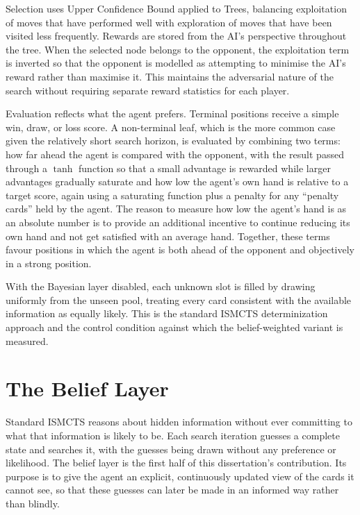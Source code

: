 \documentclass[12pt,a4paper,oneside]{report}
\begin{document}
Selection uses Upper Confidence Bound applied to Trees, balancing exploitation of moves that have performed well with exploration of moves that have been visited less frequently. Rewards are stored from the AI's perspective throughout the tree. When the selected node belongs to the opponent, the exploitation term is inverted so that the opponent is modelled as attempting to minimise the AI's reward rather than maximise it. This maintains the adversarial nature of the search without requiring separate reward statistics for each player.

Evaluation reflects what the agent prefers. Terminal positions receive a simple win, draw, or loss score. A non-terminal leaf, which is the more common case given the relatively short search horizon, is evaluated by combining two terms: how far ahead the agent is compared with the opponent, with the result passed through a $\tanh$ function so that a small advantage is rewarded while larger advantages gradually saturate and how low the agent's own hand is relative to a target score, again using a saturating function plus a penalty for any “penalty cards” held by the agent. The reason to measure how low the agent's hand is as an absolute number is to provide an additional incentive to continue reducing its own hand and not get satisfied with an average hand. Together, these terms favour positions in which the agent is both ahead of the opponent and objectively in a strong position.

With the Bayesian layer disabled, each unknown slot is filled by drawing uniformly from the unseen pool, treating every card consistent with the available information as equally likely. This is the standard ISMCTS determinization approach and the control condition against which the belief-weighted variant is measured.

\section{The Belief Layer}
\label{sec:beliefs}

Standard ISMCTS reasons about hidden information without ever committing to what that
information is likely to be. Each search iteration guesses a complete state and searches
it, with the guesses being drawn without any preference or likelihood. The belief layer
is the first half of this dissertation's contribution. Its purpose is to give the agent
an explicit, continuously updated view of the cards it cannot see, so that these guesses
can later be made in an informed way rather than blindly.
\end{document}
